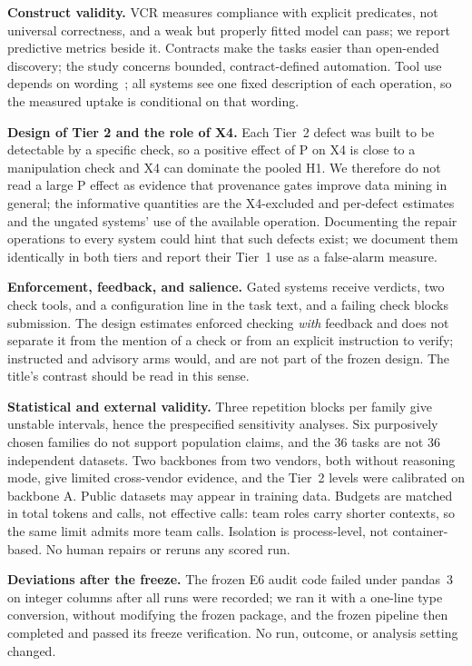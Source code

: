 \documentclass[conference]{IEEEtran}
\begin{document}
\textbf{Construct validity.} VCR measures compliance with explicit predicates, not universal correctness, and a weak
but properly fitted model can pass; we report predictive metrics beside it. Contracts make the tasks easier than
open-ended discovery; the study concerns bounded, contract-defined automation. Tool use depends on
wording~\cite{faghih2025toolprefs}; all systems see one fixed description of each operation, so the measured uptake
is conditional on that wording.

\textbf{Design of Tier 2 and the role of X4.} Each Tier~2 defect was built to be detectable by a specific check, so a
positive effect of P on X4 is close to a manipulation check and X4 can dominate the pooled H1. We therefore do not
read a large P effect as evidence that provenance gates improve data mining in general; the informative quantities
are the X4-excluded and per-defect estimates and the ungated systems' use of the available operation. Documenting
the repair operations to every system could hint that such defects exist; we document them identically in both tiers
and report their Tier~1 use as a false-alarm measure.

\textbf{Enforcement, feedback, and salience.} Gated systems receive verdicts, two check tools, and a configuration
line in the task text, and a failing check blocks submission. The design estimates enforced checking \emph{with}
feedback and does not separate it from the mention of a check or from an explicit instruction to verify; instructed
and advisory arms would, and are not part of the frozen design. The title's contrast should be read in this sense.

\textbf{Statistical and external validity.} Three repetition blocks per family give unstable intervals, hence the
prespecified sensitivity analyses. Six purposively chosen families do not support population claims, and the 36
tasks are not 36 independent datasets. Two backbones from two vendors, both without reasoning mode, give limited
cross-vendor evidence, and the Tier~2 levels were calibrated on backbone A. Public datasets may appear in training
data. Budgets are matched in total tokens and calls, not effective calls: team roles carry shorter contexts, so the
same limit admits more team calls. Isolation is process-level, not container-based. No human repairs or reruns any
scored run.

\textbf{Deviations after the freeze.} The frozen E6 audit code failed under pandas~3 on integer columns after all
runs were recorded; we ran it with a one-line type conversion, without modifying the frozen package, and the frozen
pipeline then completed and passed its freeze verification. No run, outcome, or analysis setting changed.
\end{document}
